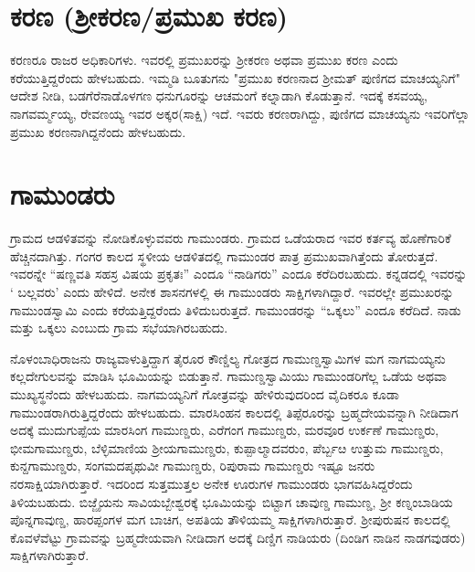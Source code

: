 \section*{ಕರಣ (ಶ‍್ರೀಕರಣ/ಪ್ರಮುಖ ಕರಣ)}

ಕರಣರೂ ರಾಜರ ಅಧಿಕಾರಿಗಳು. ಇವರಲ್ಲಿ ಪ್ರಮುಖರನ್ನು ಶ‍್ರೀಕರಣ ಅಥವಾ ಪ್ರಮುಖ ಕರಣ ಎಂದು ಕರೆಯುತ್ತಿದ್ದರೆಂದು ಹೇಳಬಹುದು. ಇಮ್ಮಡಿ ಬೂತುಗನು "ಪ್ರಮುಖ ಕರಣನಾದ ಶ‍್ರೀಮತ್​ ಪುಣಿಗದ ಮಾಚಯ್ಯನಿಗೆ" ಆದೇಶ ನೀಡಿ, ಬಡಗೆರೆನಾಡೊಳಗಣ ಧನುಗೂರನ್ನು ಆಚಮಂಗೆ ಕಲ್ನಾಡಾಗಿ ಕೊಡುತ್ತಾನೆ. ಇದಕ್ಕೆ ಕಸವಯ್ಯ, ನಾಗವರ್ಮ್ಮಯ್ಯ, ರೇವಣಯ್ಯ ಇವರ ಅಕ್ಕರ(ಸಾಕ್ಷಿ) ಇದೆ. ಇವರು ಕರಣರಾಗಿದ್ದು, ಪುಣಿಗದ ಮಾಚಯ್ಯನು ಇವರಿಗೆಲ್ಲಾ ಪ್ರಮುಖ ಕರಣನಾಗಿದ್ದನೆಂದು ಹೇಳಬಹುದು.

\section*{ಗಾಮುಂಡರು}

ಗ್ರಾಮದ ಆಡಳಿತವನ್ನು ನೋಡಿಕೊಳ್ಳುವವರು ಗಾಮುಂಡರು. ಗ್ರಾಮದ ಒಡೆಯರಾದ ಇವರ ಕರ್ತವ್ಯ ಹೊಣೆಗಾರಿಕೆ ಹೆಚ್ಚಿನದಾಗಿತ್ತು. ಗಂಗರ ಕಾಲದ ಸ್ಥಳೀಯ ಆಡಳಿತದಲ್ಲಿ ಗಾಮುಂಡರ ಪಾತ್ರ ಪ್ರಮುಖವಾಗಿತ್ತೆಂದು ತೋರುತ್ತದೆ. ಇವರನ್ನೇ “ಷಣ್ಣವತಿ ಸಹಸ್ರ ವಿಷಯ ಪ್ರಕೃತಃ” ಎಂದೂ “ನಾಡಿಗರು” ಎಂದೂ ಕರೆದಿರಬಹುದು. ಕನ್ನಡದಲ್ಲಿ ಇವರನ್ನು ` ಬಲ್ಲವರು' ಎಂದು ಹೇಳಿದೆ. ಅನೇಕ ಶಾಸನಗಳಲ್ಲಿ ಈ ಗಾಮುಂಡರು ಸಾಕ್ಷಿಗಳಾಗಿದ್ದಾರೆ. ಇವರಲ್ಲೇ ಪ್ರಮುಖರನ್ನು ಗಾಮುಂಡಸ್ವಾಮಿ ಎಂದು ಕರೆಯತ್ತಿದ್ದರೆಂದು ತಿಳಿದುಬರುತ್ತದೆ. ಗಾಮುಂಡರನ್ನು “ಒಕ್ಕಲು” ಎಂದೂ ಕರೆದಿದೆ. ನಾಡು ಮತ್ತು ಒಕ್ಕಲು ಎಂಬುದು ಗ್ರಾಮ ಸಭೆಯಾಗಿರಬಹುದು.

ನೊಳಂಬಾಧಿರಾಜನು ರಾಜ್ಯವಾಳುತ್ತಿದ್ದಾಗ ತೈರೂರ ಕೌಣ್ಡಿಲ್ಯ ಗೋತ್ರದ ಗಾಮುಣ್ಡಸ್ವಾಮಿಗಳ ಮಗ ನಾಗಮಯ್ಯನು ಕಲ್ಲದೇಗುಲವನ್ನು ಮಾಡಿಸಿ ಭೂಮಿಯನ್ನು ಬಿಡುತ್ತಾನೆ. ಗಾಮುಣ್ಡಸ್ವಾಮಿಯು ಗಾಮುಂಡರಿಗೆಲ್ಲ ಒಡೆಯ ಅಥವಾ ಮುಖ್ಯಸ್ಥನೆಂದು ಹೇಳಬಹುದು. ನಾಗಮಯ್ಯನಿಗೆ ಗೋತ್ರವನ್ನು ಹೇಳಿರುವುದರಿಂದ ವೈದಿಕರೂ ಕೂಡಾ ಗಾಮುಂಡರಾಗಿರು\-ತ್ತಿದ್ದರೆಂದು ಹೇಳಬಹುದು. ಮಾರಸಿಂಹನ ಕಾಲದಲ್ಲಿ ತಿಪ್ಪೆರೂರನ್ನು ಬ್ರಹ್ಮದೇಯವನ್ನಾಗಿ ನೀಡಿದಾಗ ಅದಕ್ಕೆ ಮುದುಗುಪ್ಪೆಯ ಮಾರಸಿಂಗ ಗಾಮುಣ್ಡರು, ಎರೆಗಂಗ ಗಾಮುಣ್ಡರು, ಮರವೂರ ಉರ್ಕಣೆ ಗಾಮುಣ್ಡರು, ಭೀಮಗಾಮುಣ್ಡರು, ಬೆಳ್ಳಿಮಾಣಿಯ ಶ‍್ರೀಯಗಾಮುಣ್ಡರು, ಕುಪ್ಪಾಲ್ಮಾದವರುಂ, ಪೆರ್ಬ್ಬೞ ಉತ್ತುಮ ಗಾಮುಣ್ಡರು, ಕುನ್ದಗಾಮುಣ್ಡರು, ಸಂಗಮದ\break ಪೃಥುವೀ ಗಾಮುಣ್ಡರು, ರಿಪುರಾಮ ಗಾಮುಣ್ಡರು ಇಷ್ಟೂ ಜನರು ನರಸಾಕ್ಷಿಯಾಗಿರುತ್ತಾರೆ. ಇದರಿಂದ ಸುತ್ತಮುತ್ತಲ ಅನೇಕ ಊರುಗಳ ಗಾಮುಂಡರು ಭಾಗವಹಿಸಿದ್ದರೆಂದು ತಿಳಿಯಬಹುದು. ಬಿಜ್ಜೈಯನು ಸಾವಿಯಬ್ಬೇಶ್ವರಕ್ಕೆ ಭೂಮಿಯನ್ನು ಬಿಟ್ಟಾಗ ಚಾವುಣ್ಡ ಗಾಮುಣ್ಡ, ಶ‍್ರೀ ಕಣ್ನಂಬಾಡಿಯ ಪೊನ್ನಗಾವುಣ್ಡ, ಹಾರಪ್ಪಂಗಳ ಮಗ ಬಾಚಿಗ, ಅಪತಿಯ ತೌಳಿಯಮ್ಮ ಸಾಕ್ಷಿಗಳಾಗಿರುತ್ತಾರೆ. ಶ‍್ರೀಪುರುಷನ ಕಾಲದಲ್ಲಿ ಕೊವಳೆವೆಟ್ಟು ಗ್ರಾಮವನ್ನು ಬ್ರಹ್ಮದೇಯವಾಗಿ ನೀಡಿದಾಗ ಅದಕ್ಕೆ ದಿಣ್ಡಿಗ ನಾಡಿಯರು (ದಿಂಡಿಗ ನಾಡಿನ ನಾಡಗವುಡರು) ಸಾಕ್ಷಿಗಳಾಗಿರುತ್ತಾರೆ.

